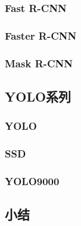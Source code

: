 \subsubsection{Fast R-CNN}
\subsubsection{Faster R-CNN}
\subsubsection{Mask R-CNN}
\subsection{YOLO系列}
\subsubsection{YOLO}
\subsubsection{SSD}
\subsubsection{YOLO9000}
\subsection{小结}





